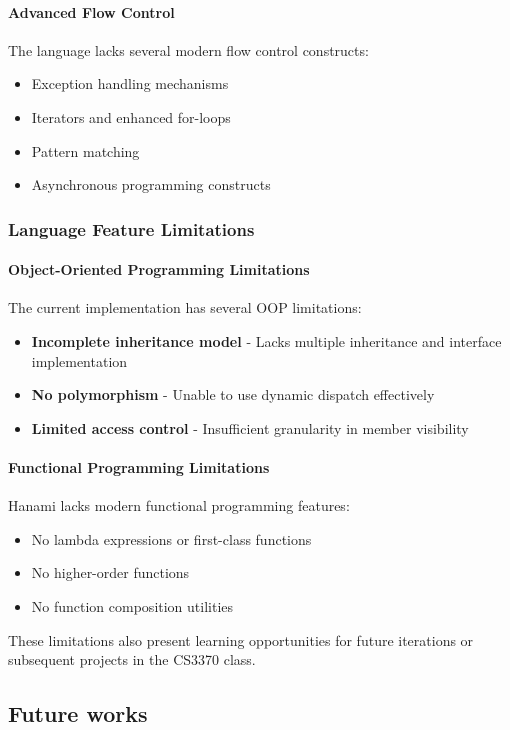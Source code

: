 \documentclass[conference]{IEEEtran}
\begin{document}
\paragraph{Advanced Flow Control}
The language lacks several modern flow control constructs:
\begin{itemize}
\item Exception handling mechanisms
\item Iterators and enhanced for-loops
\item Pattern matching
\item Asynchronous programming constructs
\end{itemize}
\subsubsection{Language Feature Limitations}
\paragraph{Object-Oriented Programming Limitations}
The current implementation has several OOP limitations:
\begin{itemize}
\item \textbf{Incomplete inheritance model} - Lacks multiple inheritance and interface implementation
\item \textbf{No polymorphism} - Unable to use dynamic dispatch effectively
\item \textbf{Limited access control} - Insufficient granularity in member visibility
\end{itemize}
\paragraph{Functional Programming Limitations}
Hanami lacks modern functional programming features:
\begin{itemize}
\item No lambda expressions or first-class functions
\item No higher-order functions
\item No function composition utilities
\end{itemize}

These limitations also present learning opportunities for future iterations or subsequent projects in the CS3370 class.

\subsection{Future works}
\end{document}
